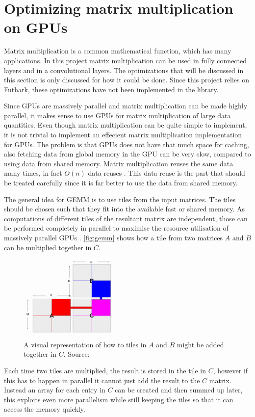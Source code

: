 \section{Optimizing matrix multiplication on GPUs}%
\label{sec:matmul}

Matrix multiplication is a common mathematical function, which has many applications.
In this project matrix multiplication can be used in fully connected layers and in a convolutional layers.
The optimizations that will be discussed in this section is only discussed for how it could be done.
Since this project relies on Futhark, these optimizations have not been implemented in the library.

Since GPUs are massively parallel and matrix multiplication can be made highly parallel, it makes sense to use GPUs for matrix multiplication of large data quantities.
Even though matrix multiplication can be quite simple to implement, it is not trivial to implement an effecient matrix multiplication implementation for GPUs.
The problem is that GPUs does not have that much space for caching, also fetching data from global memory in the GPU can be very slow, compared to using data from shared memory.
Matrix multiplication reuses the same data many times, in fact $O(n)$ data reuses \cite{performant_gemm}.
This data reuse is the part that should be treated carefully since it is far better to use the data from shared memory.


The general idea for GEMM is to use tiles from the input matrices.
The tiles should be chosen such that they fit into the available fast or shared memory.
As computations of different tiles of the resultant
matrix are independent, those can be performed completely
in parallel to maximise the resource utilisation of massively
parallel GPUs \cite{performant_gemm}.
\autoref{fig:gemm} shows how a tile from two matrices $A$ and $B$ can be multiplied together in $C$.
\begin{figure}
  \centering
  \includegraphics[width=0.45\textwidth]{assets/gemm.png}
  \caption{A visual representation of how to tiles in $A$ and $B$ might be added together in $C$. Source: \cite{gemm}}
  \label{fig:gemm}
\end{figure}
Each time two tiles are multiplied, the result is stored in the tile in $C$, however if this has to happen in parallel it cannot just add the result to the $C$ matrix.
Instead an array for each entry in $C$ can be created and then summed up later, this exploits even more parallelism while still keeping the tiles so that it can access the memory quickly.
